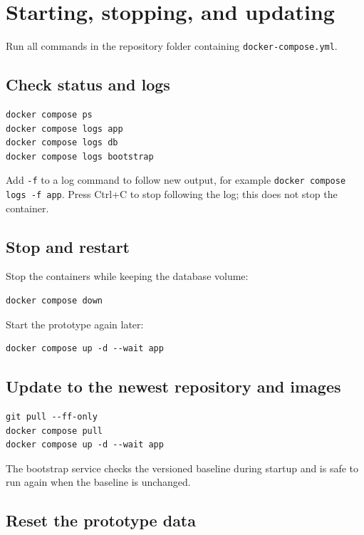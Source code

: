 \documentclass[11pt,a4paper]{article}
\begin{document}
\section{Starting, stopping, and updating}

Run all commands in the repository folder containing
\texttt{docker-compose.yml}.

\subsection{Check status and logs}

\begin{lstlisting}[style=terminal]
docker compose ps
docker compose logs app
docker compose logs db
docker compose logs bootstrap
\end{lstlisting}

Add \texttt{-f} to a log command to follow new output, for example
\texttt{docker compose logs -f app}. Press Ctrl+C to stop following the log;
this does not stop the container.

\subsection{Stop and restart}

Stop the containers while keeping the database volume:

\begin{lstlisting}[style=terminal]
docker compose down
\end{lstlisting}

Start the prototype again later:

\begin{lstlisting}[style=terminal]
docker compose up -d --wait app
\end{lstlisting}

\subsection{Update to the newest repository and images}

\begin{lstlisting}[style=terminal]
git pull --ff-only
docker compose pull
docker compose up -d --wait app
\end{lstlisting}

The bootstrap service checks the versioned baseline during startup and is
safe to run again when the baseline is unchanged.

\subsection{Reset the prototype data}
\label{sec:reset-data}
\end{document}
